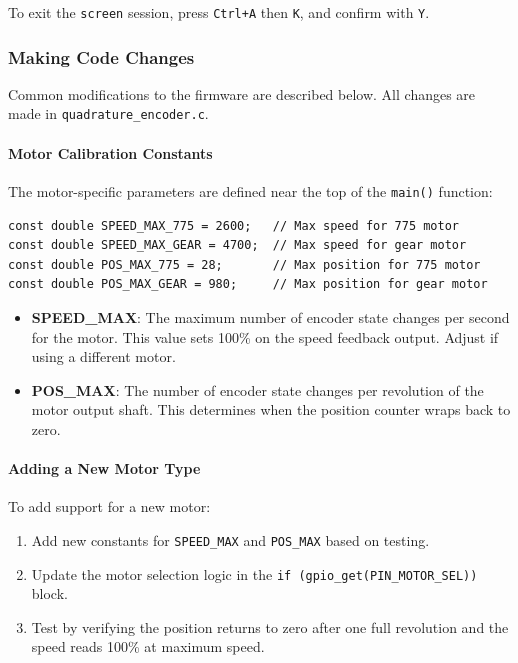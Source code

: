 \documentclass[main.tex]{subfiles}
\begin{document}
\vspace{6pt}
\noindent To exit the \texttt{screen} session, press \texttt{Ctrl+A} then \texttt{K}, and confirm with \texttt{Y}.

\subsubsection{Making Code Changes}
\label{sec:code_changes}

Common modifications to the firmware are described below. All changes are made in \texttt{quadrature\_encoder.c}.

\paragraph{Motor Calibration Constants}

The motor-specific parameters are defined near the top of the \texttt{main()} function:

\begin{verbatim}
const double SPEED_MAX_775 = 2600;   // Max speed for 775 motor
const double SPEED_MAX_GEAR = 4700;  // Max speed for gear motor
const double POS_MAX_775 = 28;       // Max position for 775 motor
const double POS_MAX_GEAR = 980;     // Max position for gear motor
\end{verbatim}

\begin{itemize}
    \item \textbf{SPEED\_MAX}: The maximum number of encoder state changes per second for the motor. This value sets 100\% on the speed feedback output. Adjust if using a different motor.
    \item \textbf{POS\_MAX}: The number of encoder state changes per revolution of the motor output shaft. This determines when the position counter wraps back to zero.
\end{itemize}

\paragraph{Adding a New Motor Type}

To add support for a new motor:
\begin{enumerate}
    \item Add new constants for \texttt{SPEED\_MAX} and \texttt{POS\_MAX} based on testing.
    \item Update the motor selection logic in the \texttt{if (gpio\_get(PIN\_MOTOR\_SEL))} block.
    \item Test by verifying the position returns to zero after one full revolution and the speed reads 100\% at maximum speed.
\end{enumerate}
\end{document}
